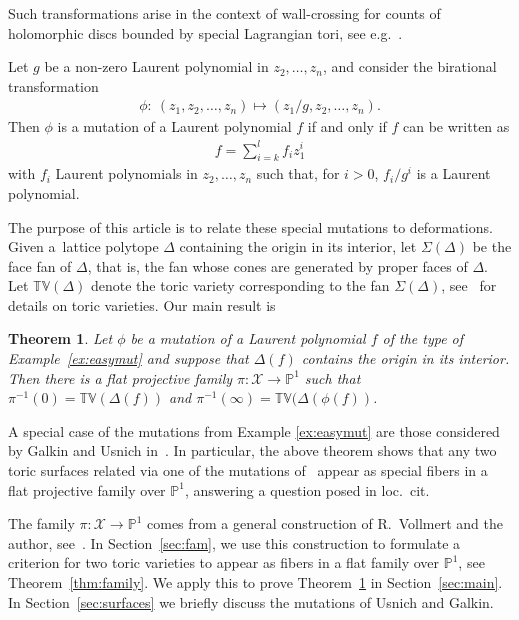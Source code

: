 \documentclass[pdftex]{sigma}
\newcommand{\PP}{\mathbb{P}}
\newcommand{\tv}{\mathbb{TV}}
\newcommand{\cX}{\mathcal{X}}
\newtheorem{Theorem}{Theorem}[section]
 { \theoremstyle{definition}
\newtheorem{Definition}[Theorem]{Definition}
\newtheorem{Example}[Theorem]{Example}
\newtheorem{Remark}[Theorem]{Remark} }
\begin{document}
 Such  transformations arise in the context of wall-crossing for counts of holomorphic discs bounded by special Lagrangian tori, see e.g.~\cite{auroux}.

\begin{Example}\label{ex:easymut}
Let $g$ be a non-zero Laurent polynomial in $z_2,\ldots,z_n$, and consider the birational transformation
\begin{gather*}	
	\phi: \ (z_1,z_2,\ldots,z_n)\mapsto (z_1/g,z_2,\ldots,z_n).
\end{gather*}
Then $\phi$ is a mutation of a Laurent polynomial $f$ if and only if $f$ can be written as
\begin{gather*}
f=\sum_{i=k}^l f_i z_1^i
\end{gather*}
with $f_i$ Laurent polynomials in $z_2,\ldots,z_n$ such that, for $i>0$, $f_i/g^i$ is a Laurent polynomial.
\end{Example}

The purpose of this article is to relate these special mutations to deformations. Given a~lattice polytope $\Delta$ containing the origin in its interior, let
$\Sigma(\Delta)$ be the face fan of $\Delta$, that is, the fan whose cones are generated by proper faces of $\Delta$. Let $\tv(\Delta)$ denote the toric variety corresponding to the fan $\Sigma(\Delta)$, see~\cite{fulton:93a} for details on toric varieties.  Our main result is

\begin{Theorem}\label{thm:main}
	Let $\phi$ be a mutation of a Laurent polynomial $f$ of the type of Example~{\rm \ref{ex:easymut}} and suppose that $\Delta(f)$ contains the origin in its interior. Then there is a flat projective family $\pi\colon \cX\to\PP^1$ such that $\pi^{-1}(0)=\tv(\Delta(f))$ and $\pi^{-1}(\infty)=\tv(\Delta(\phi(f))$.
\end{Theorem}


A special case of the mutations from Example \ref{ex:easymut} are those considered by Galkin and Usnich in~\cite{galkin}. In particular, the above theorem shows that any two toric surfaces related via one of the mutations of~\cite{galkin} appear as special f\/ibers in a f\/lat projective family over $\PP^1$, answering a question posed in loc.~cit.

The family $\pi\colon \cX\to\PP^1$  comes from a general construction of R.~Vollmert and the author, see~\cite{ilten:09b}. In Section~\ref{sec:fam}, we use this construction to formulate a criterion for two toric varieties to appear as f\/ibers in a f\/lat family over $\PP^1$, see Theorem~\ref{thm:family}.
We apply this to prove Theorem~\ref{thm:main} in Section~\ref{sec:main}. In Section~\ref{sec:surfaces} we brief\/ly discuss the mutations of Usnich and Galkin.
\end{document}
